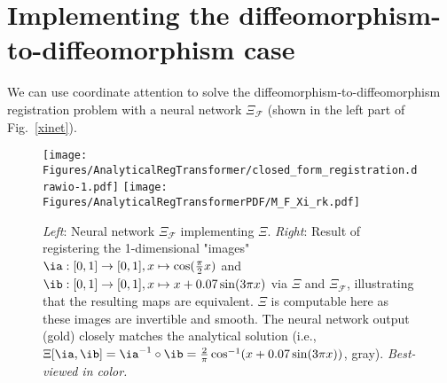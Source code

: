\section{Implementing the diffeomorphism-to-diffeomorphism case}
\label{subsection:xinetimplementation}

We can use coordinate attention to solve the diffeomorphism-to-diffeomorphism registration problem with a neural network $\Xi_\mathcal{F}$ (shown in the left part of Fig.~\ref{xinet}).


\begin{figure*}[htp]
    \centering
    \texttt{[image: Figures/AnalyticalRegTransformer/closed\_form\_registration.drawio-1.pdf]}
    \texttt{[image: Figures/AnalyticalRegTransformerPDF/M\_F\_Xi\_rk.pdf]}
    \caption{\label{xinet}\emph{Left}: Neural network $\Xi_\mathcal{F}$ implementing $\Xi$. \emph{Right}: Result of registering the 1-dimensional "images" $\ia : [0, 1] \rightarrow[0, 1], x \mapsto \cos(\frac{\pi}{2} x)$ and $\ib : [0, 1] \rightarrow[0, 1], x \mapsto x + 0.07 \sin(3\pi x)$ via $\Xi$ and $\Xi_\mathcal{F}$, illustrating that the resulting maps are equivalent. $\Xi$ is computable here as these images are invertible and smooth. The neural network output (gold) closely matches the analytical solution (i.e., $\Xi[\ia, \ib] = \ia^{-1} \circ \ib = \frac{2}{\pi} \cos^{-1}(x + 0.07 \sin(3\pi x))$, gray).\label{Fig:analytincal} \emph{Best-viewed in color.}}
\end{figure*}

